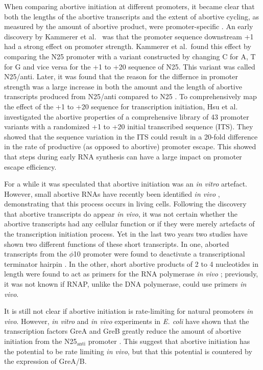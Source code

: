 When comparing abortive initiation at different promoters, it became clear that
both the lengths of the abortive transcripts and the extent of abortive
cycling, as measured by the amount of abortive product, were promoter-specific
\cite{hsu_vitro_2003}. An early discovery by Kammerer et al.\
\cite{kammerer_functional_1986} was that the promoter sequence downstream +1
had a strong effect on promoter strength.  Kammerer et al.\ found this effect
by comparing the N25 promoter with a variant constructed by changing C for A, T
for G and vice versa for the +1 to +20 sequence of N25.  This variant was
called N25/anti. Later, it was found that the reason for the differnce in
promoter strength was a large increase in both the amount and the length of
abortive transcripts produced from N25/anti compared to N25
\cite{hsu_escherichia_1995,hsu_vitro_2003}. To comprehensively map the effect
of the +1 to +20 sequence for transcription initiation, Hsu et al.\
\cite{hsu_initial_2006} investigated the abortive properties of a comprehensive
library of 43 promoter variants with a randomized +1 to +20 initial transcribed
sequence (ITS). They showed that the sequence variation in the ITS could result
in a 20-fold difference in the rate of productive (as opposed to abortive)
promoter escape.  This showed that steps during early RNA synthesis can have a
large impact on promoter escape efficiency.

For a while it was speculated that abortive initiation was an \textit{in vitro}
artefact. However, small abortive RNAs have recently been identified \textit{in
vivo} \cite{goldman_direct_2009}, demonstrating that this process occurs in
living cells. Following the discovery that abortive transcripts do appear
\textit{in vivo}, it was not certain whether the abortive transcripts had any
cellular function or if they were merely artefacts of the transcription
initiation process. Yet in the last two years two studies have shown two
different functions of these short transcripts. In one, aborted transcripts
from the $\phi$10 promoter were found to deactivate a transcriptional
terminator hairpin \cite{lee_tiny_2010}. In the other, short abortive products
of 2 to 4 nucleotides in length were found to act as primers for the RNA
polymerase \textit{in vivo} \cite{goldman_nanornas_2011}; previously, it was
not known if RNAP, unlike the DNA polymerase, could use primers \textit{in
vivo}.

It is still not clear if abortive initiation is rate-limiting for natural
promoters \textit{in vivo}. However, \textit{in vitro} and \textit{in vivo}
experiments in \textit{E. coli} have shown that the transcription factors GreA
and GreB greatly reduce the amount of abortive initiation from the
N25$_{\text{anti}}$ promoter \cite{hsu_escherichia_1995}. This suggest that
abortive initiation has the potential to be rate limiting \textit{in vivo}, but
that this potential is countered by the expression of GreA/B.


